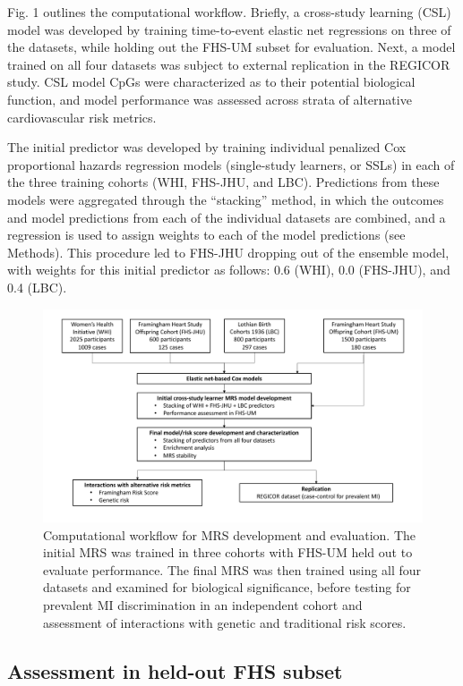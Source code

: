\documentclass[]{article}
\begin{document}
Fig. 1 outlines the computational workflow. Briefly, a cross-study
learning (CSL) model was developed by training time-to-event elastic net
regressions on three of the datasets, while holding out the FHS-UM
subset for evaluation. Next, a model trained on all four datasets was
subject to external replication in the REGICOR study. CSL model CpGs
were characterized as to their potential biological function, and model
performance was assessed across strata of alternative cardiovascular
risk metrics.

The initial predictor was developed by training individual penalized Cox
proportional hazards regression models (single-study learners, or SSLs)
in each of the three training cohorts (WHI, FHS-JHU, and LBC).
Predictions from these models were aggregated through the ``stacking''
method, in which the outcomes and model predictions from each of the
individual datasets are combined, and a regression is used to assign
weights to each of the model predictions (see Methods). This procedure
led to FHS-JHU dropping out of the ensemble model, with weights for this
initial predictor as follows: 0.6 (WHI), 0.0 (FHS-JHU), and 0.4 (LBC).

\begin{figure}
\centering
\includegraphics{workflow.pdf}
\caption{Computational workflow for MRS development and evaluation. The
initial MRS was trained in three cohorts with FHS-UM held out to
evaluate performance. The final MRS was then trained using all four
datasets and examined for biological significance, before testing for
prevalent MI discrimination in an independent cohort and assessment of
interactions with genetic and traditional risk scores.}
\end{figure}

\hypertarget{assessment-in-held-out-fhs-subset}{%
\subsection{Assessment in held-out FHS
subset}\label{assessment-in-held-out-fhs-subset}}
\end{document}
